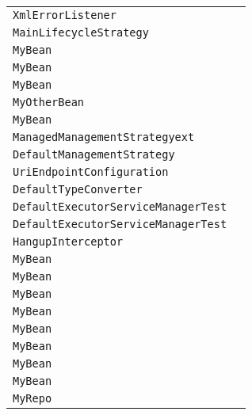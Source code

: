 \begin{center}
\begin{tabular}{ll}
\lstinline/XmlErrorListener/&\raisebox{0pt}{\lstinline/warning(TransformerException)/}\\
\lstinline/MainLifecycleStrategy/&\raisebox{0pt}{\lstinline/onContextStop(CamelContext)/}\\
\lstinline/MyBean/&\raisebox{0pt}{\lstinline/read(String)/}\\
\lstinline/MyBean/&\raisebox{0pt}{\lstinline/foo(String)/}\\
\lstinline/MyBean/&\raisebox{0pt}{\lstinline/foo(String)/}\\
\lstinline/MyOtherBean/&\raisebox{0pt}{\lstinline/foo(String)/}\\
\lstinline/MyBean/&\raisebox{0pt}{\lstinline/intread(String)/}\\
\lstinline/ManagedManagementStrategyext/&\raisebox{0pt}{\lstinline/doStart()/}\\
\lstinline/DefaultManagementStrategy/&\raisebox{0pt}{\lstinline/doStart()/}\\
\lstinline/UriEndpointConfiguration/&\raisebox{0pt}{\lstinline/warnMissingUriParamOnProperty(String)/}\\
\lstinline/DefaultTypeConverter/&\raisebox{0pt}{\lstinline/doStart()/}\\
\lstinline/DefaultExecutorServiceManagerTest/&\raisebox{0pt}{\lstinline/run()/}\\
\lstinline/DefaultExecutorServiceManagerTest/&\raisebox{0pt}{\lstinline/run()/}\\
\lstinline/HangupInterceptor/&\raisebox{0pt}{\lstinline/run()/}\\
\lstinline/MyBean/&\raisebox{0pt}{\lstinline/myMethod(Stringfoo,intbar,Stringx)/}\\
\lstinline/MyBean/&\raisebox{0pt}{\lstinline/myMethod(HeadersMap,Object)/}\\
\lstinline/MyBean/&\raisebox{0pt}{\lstinline/myMethod(PropertiesMap,HeadersMap)/}\\
\lstinline/MyBean/&\raisebox{0pt}{\lstinline/read(String,String)/}\\
\lstinline/MyBean/&\raisebox{0pt}{\lstinline/read(String,String)/}\\
\lstinline/MyBean/&\raisebox{0pt}{\lstinline/Stringread(String,String)/}\\
\lstinline/MyBean/&\raisebox{0pt}{\lstinline/myMethod(List<User>,Object)/}\\
\lstinline/MyBean/&\raisebox{0pt}{\lstinline/myMethod(List<User>,Object)/}\\
\lstinline/MyRepo/&\raisebox{0pt}{\lstinline/confirm(CamelContext,String)/}\\

\end{tabular}
\end{center}
